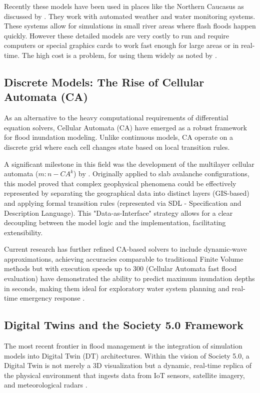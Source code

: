 Recently these models have been used in places like the Northern Caucasus as discussed by \cite{Vasileva2021}. They work with automated 
weather and water monitoring systems. These systems allow for simulations in small river areas where flash floods happen quickly. 
However these detailed models are very costly to run and require computers or special graphics cards to work fast enough for large 
areas or in real-time. The high cost is a problem, for using them widely as noted by \cite{Aleksyuk2017}.


\subsection{Discrete Models: The Rise of Cellular Automata (CA)}

As an alternative to the heavy computational requirements of differential equation solvers, Cellular Automata (CA) have 
emerged as a robust framework for flood inundation modeling. Unlike continuous models, CA operate on a discrete grid 
where each cell changes state based on local transition rules.

A significant milestone in this field was the development of the multilayer cellular automata ($m:n-CA^k$) by \cite{Fonseca2011}. 
Originally applied to slab avalanche configurations, this model proved that complex geophysical phenomena 
could be effectively represented by separating the geographical data into distinct layers (GIS-based) and applying formal 
transition rules (represented via SDL - Specification and Description Language). This "Data-as-Interface" strategy allows 
for a clear decoupling between the model logic and the implementation, facilitating extensibility.

Current research has further refined CA-based solvers to include dynamic-wave approximations, achieving 
accuracies comparable to traditional Finite Volume methods but with execution speeds up to 300%
(Cellular Automata fast flood evaluation) have demonstrated the ability to predict maximum inundation depths in seconds, making 
them ideal for exploratory water system planning and real-time emergency response \parencite{Jamali2019}.


\subsection{Digital Twins and the Society 5.0 Framework}

The most recent frontier in flood management is the integration of simulation models into Digital Twin (DT) architectures. 
Within the vision of Society 5.0, a Digital Twin is not merely a 3D visualization but a dynamic, real-time replica of the 
physical environment that ingests data from IoT sensors, satellite imagery, and meteorological radars \parencite{FonsecaiCasas2026}.

